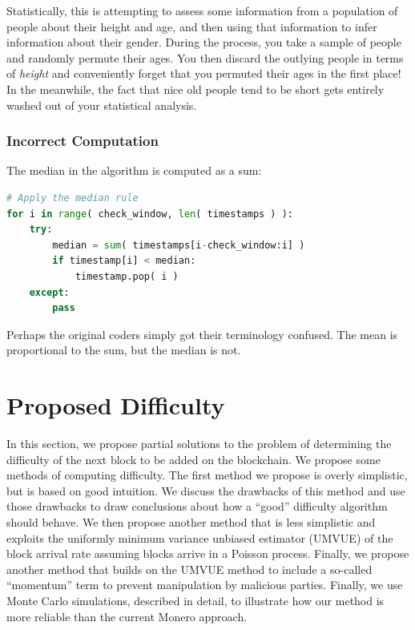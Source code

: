 \documentclass[12pt,english]{mrl}
\theoremstyle{definition}
\numberwithin{equation}{section}
\numberwithin{figure}{section}
\numberwithin{equation}{section}
\numberwithin{equation}{section}
\numberwithin{figure}{section}
\begin{document}
Statistically, this is attempting to assess some information from a population of people about their height and age, and then using that information to infer information about their gender. During the process, you take a sample of people and randomly permute their ages. You then discard the outlying people in terms of \textit{height} and conveniently forget that you permuted their ages in the first place! In the meanwhile, the fact that nice old people tend to be short gets entirely washed out of your statistical analysis. 

\subsubsection{Incorrect Computation}
The median in the algorithm is computed as a sum:

\begin{lstlisting}[language=Python,basicstyle=\small,breaklines=true]
# Apply the median rule
for i in range( check_window, len( timestamps ) ):
    try:
        median = sum( timestamps[i-check_window:i] )
        if timestamp[i] < median:
            timestamp.pop( i )
    except:
        pass
\end{lstlisting}
Perhaps the original coders simply got their terminology confused. The mean is proportional to the sum, but the median is not.

\section{Proposed Difficulty}\label{proposedChanges}

In this section, we propose partial solutions to the problem of determining the difficulty of the next block to be added on the blockchain. We propose some methods of computing difficulty. The first method we propose is overly simplistic, but is based on good intuition. We discuss the drawbacks of this method and use those drawbacks to draw conclusions about how a ``good'' difficulty algorithm should behave. We then propose another method that is less simplistic and exploits the uniformly minimum variance unbiased estimator (UMVUE) of the block arrival rate assuming blocks arrive in a Poisson process. Finally, we propose another method that builds on the UMVUE method to include a so-called ``momentum'' term to prevent manipulation by malicious parties. Finally, we use Monte Carlo simulations, described in detail, to illustrate how our method is more reliable than the current Monero approach. 
\end{document}

